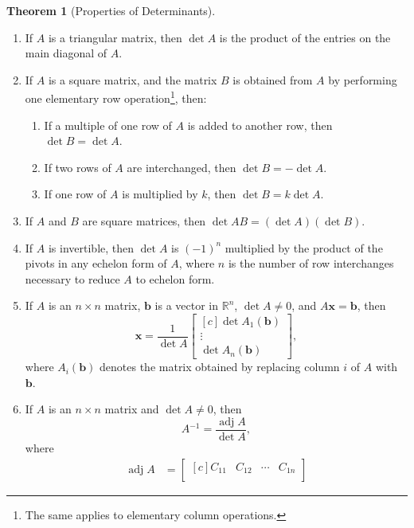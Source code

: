 \documentclass{myart}
\renewcommand{\vec}[1]{\ensuremath{\mathbf{#1}}}
\newcommand{\mat}[1]{\ensuremath{#1}}
\newcommand{\R}[1][]{\ensuremath{\mathbb{R}^{#1}}}
\newcommand{\by}{\ensuremath{\times}}
\newcommand{\MAT}[2][r]{\ensuremath{\begin{bmatrix*}[#1]#2\end{bmatrix*}}}
\newcommand{\inv}{\ensuremath{^{-1}}}
\DeclareMathOperator{\adj}{adj}
\theoremstyle{definition}
\newtheorem{thm}{Theorem}
\begin{document}
\begin{thm}[Properties of Determinants] \hfill
  \begin{enumerate}
  \item If \mat A is a triangular matrix, then $\det \mat A$ is the
    product of the entries on the main diagonal of \mat A.
  \item If \mat A is a square matrix, and the matrix \mat B is
    obtained from \mat A by performing one elementary row
    operation\footnote{The same applies to elementary column
      operations.}, then:
    \begin{enumerate}
    \item If a multiple of one row of \mat A is added to another row,
      then $\det \mat B = \det \mat A$.
    \item If two rows of \mat A are interchanged, then $\det \mat B =
      -\det \mat A$.
    \item If one row of \mat A is multiplied by $k$, then $\det \mat B
      = k \det \mat A$.
    \end{enumerate}
  \item If \mat A and \mat B are square matrices, then $\det \mat
    A\mat B = (\det \mat A)(\det \mat B)$.
  \item If \mat A is invertible, then $\det \mat A$ is $(-1)^n$
    multiplied by the product of the pivots in any echelon form of
    \mat A, where $n$ is the number of row interchanges necessary to
    reduce \mat A to echelon form.
  \item If \mat A is an $n \by n$ matrix, \vec b is a vector in \R[n],
    $\det \mat A \neq 0$, and $\mat A\vec x = \vec b$, then
    \begin{equation*}
      \vec x = \frac{1}{\det \mat A} \MAT[c]{
        \det \mat A_1(\vec b) \\ \vdots \\ \det \mat A_n(\vec b)
      },
    \end{equation*}
    where $\mat A_i(\vec b)$ denotes the matrix obtained by replacing
    column $i$ of \mat A with \vec b.
  \item If \mat A is an $n \by n$ matrix and $\det \mat A \neq 0$,
    then
    \begin{equation*}
      \mat A\inv = \frac{\adj \mat A}{\det \mat A},
    \end{equation*}
    where
    \begin{align*}
      \adj \mat A &= \MAT[c]{
                       C_{11} & C_{12} & \cdots & C_{1n} \\
}
\end{align*}
\end{enumerate}
\end{thm}
\end{document}
